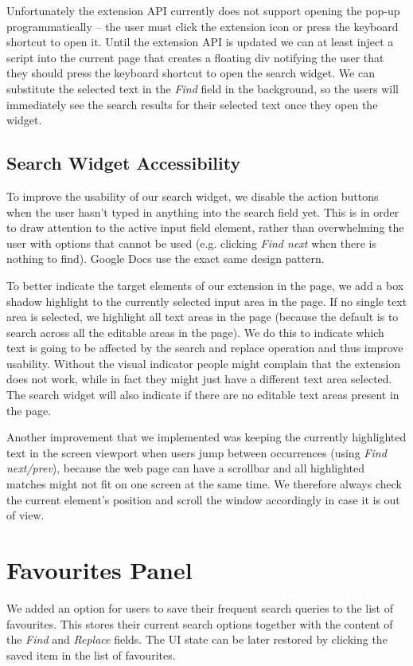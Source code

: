 \documentclass[bsc,frontabs,twoside,singlespacing,parskip,deptreport]{infthesis}
\begin{document}
Unfortunately the extension API currently does not support opening the pop-up programmatically \cite{A19} -- the user must click the extension icon or press the keyboard shortcut to open it. Until the extension API is updated we can at least inject a script into the current page that creates a floating div notifying the user that they should press the keyboard shortcut to open the search widget. We can substitute the selected text in the \textit{Find} field in the background, so the users will immediately see the search results for their selected text once they open the widget.

\subsection{Search Widget Accessibility}
To improve the usability of our search widget, we disable the action buttons when the user hasn't typed in anything into the search field yet. This is in order to draw attention to the active input field element, rather than overwhelming the user with options that cannot be used (e.g. clicking \textit{Find next} when there is nothing to find). Google Docs use the exact same design pattern. 

To better indicate the target elements of our extension in the page, we add a box shadow highlight to the currently selected input area in the page. If no single text area is selected, we highlight all text areas in the page (because the default is to search across all the editable areas in the page). We do this to indicate which text is going to be affected by the search and replace operation and thus improve usability. Without the visual indicator people might complain that the extension does not work, while in fact they might just have a different text area selected. The search widget will also indicate if there are no editable text areas present in the page.

Another improvement that we implemented was keeping the currently highlighted text in the screen viewport when users jump between occurrences (using \textit{Find next/prev}), because the web page can have a scrollbar and all highlighted matches might not fit on one screen at the same time. We therefore always check the current element's position and scroll the window accordingly in case it is out of view.

\section{Favourites Panel}
We added an option for users to save their frequent search queries to the list of favourites. This stores their current search options together with the content of the \textit{Find} and \textit{Replace} fields. The UI state can be later restored by clicking the saved item in the list of favourites.
\end{document}
